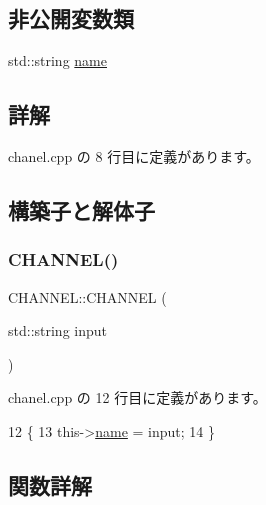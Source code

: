 \subsection*{非公開変数類}
\begin{DoxyCompactItemize}
\item 
std\+::string \hyperlink{class_c_h_a_n_n_e_l_a1a513303b0e58b1c9e0e9e03f9f50617}{name}
\end{DoxyCompactItemize}


\subsection{詳解}


 chanel.\+cpp の 8 行目に定義があります。



\subsection{構築子と解体子}
\mbox{\label{class_c_h_a_n_n_e_l_a233c9484f865fee53d66da81fb6b9e2d}} 
\subsubsection{\texorpdfstring{C\+H\+A\+N\+N\+E\+L()}{CHANNEL()}}
{\footnotesize\ttfamily C\+H\+A\+N\+N\+E\+L\+::\+C\+H\+A\+N\+N\+EL (\begin{DoxyParamCaption}\item[{std\+::string}]{input }\end{DoxyParamCaption})\hspace{0.3cm}{\ttfamily [inline]}}



 chanel.\+cpp の 12 行目に定義があります。


\begin{DoxyCode}
12                             \{
13         this->\hyperlink{class_c_h_a_n_n_e_l_a1a513303b0e58b1c9e0e9e03f9f50617}{name} = input;
14     \}
\end{DoxyCode}


\subsection{関数詳解}
\mbox{\label{class_c_h_a_n_n_e_l_aa9daccb6ddb609e501245fed29f0adfd}} 

